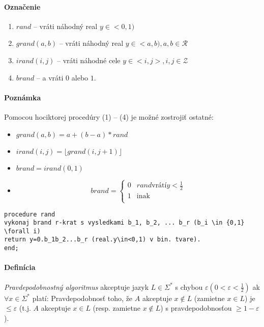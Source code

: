 \documentclass{article}
\begin{document}
\paragraph{Označenie}
\begin{enumerate}
	\item $rand$ -- vráti náhodný real $y \in <0,1)$
	\item $grand(a,b)$ -- vráti náhodný real $y \in <a,b), a,b \in
	\mathcal{R}$
	\item $irand(i,j)$ -- vráti náhodné cele $y \in <i,j>, i,j\in
	\mathcal{Z}$
	\item $brand$ --  a vráti $0$ alebo $1$.
\end{enumerate}

\paragraph{Poznámka} Pomocou hociktorej procedúry (1) -- (4) je možné zostrojiť
ostatné:
\begin{itemize}
	\item $grand(a,b) = a + (b-a)*rand$
	\item $irand(i,j) = \lfloor grand(i,j+1)\rfloor$
	\item $brand=irand(0,1)$
	\item $$brand = \left\{ 
		\begin{array}{ll}
			0 & rand \mbox{vrátí} y < \frac{1}{2} \\
			1 & \mbox{inak} \\
		\end{array} \right.
		$$
\end{itemize}

\begin{verbatim}
procedure rand
vykonaj brand r-krat s vysledkami b_1, b_2, ... b_r (b_i \in {0,1} \forall i)
return y=0.b_1b_2...b_r (real.y\in<0,1) v bin. tvare).
end;
\end{verbatim}

\paragraph{Definícia} \emph{Pravdepodobnostný algoritmus} akceptuje jazyk $L \in
\Sigma^*$ s chybou $\varepsilon (0<\varepsilon<\frac{1}{2})$ ak $\forall x \in
\Sigma^*$ platí: Pravdepodobnosť toho, že $A$ akceptuje $x \notin L$ (zamietne
$x \in L$) je $ \leq \varepsilon$ (t.j. $A$ akceptuje $x \in L$ (resp. zamietne
$x \notin L$) s pravdepodobnosťou $\geq 1 - \varepsilon$).
\end{document}
